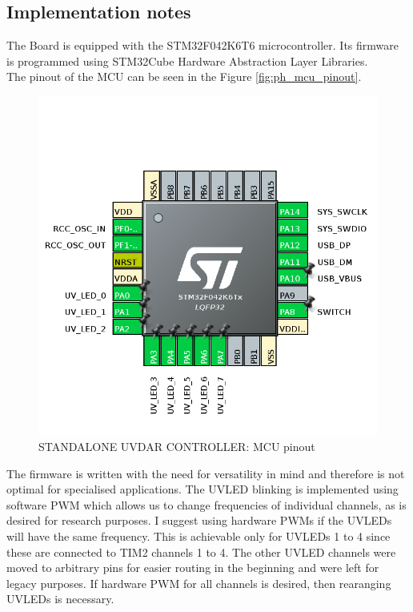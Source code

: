 \documentclass[12pt, a4paper]{article}
\begin{document}
\subsection{Implementation notes}
The Board is equipped with the STM32F042K6T6 microcontroller. Its firmware is programmed using STM32Cube Hardware Abstraction Layer Libraries.\\
The pinout of the MCU can be seen in the Figure \ref{fig:ph_mcu_pinout}.\\
\begin{figure}[h]
\centering
\includegraphics[width=0.9\linewidth]{figures/MCU_Pinout.png}
\caption{STANDALONE UVDAR CONTROLLER: MCU pinout}
\label{fig:mcu_pinout}
\end{figure}
The firmware is written with the need for versatility in mind and therefore is not optimal for specialised applications. The UVLED blinking is implemented using software PWM which allows us to change frequencies of individual channels, as is desired for research purposes. I suggest using hardware PWMs if the UVLEDs will have the same frequency. This is achievable only for UVLEDs 1 to 4 since these are connected to TIM2 channels 1 to 4. The other UVLED channels were moved to arbitrary pins for easier routing in the beginning and were left for legacy purposes. If hardware PWM for all channels is desired, then rearanging UVLEDs is necessary.

\pagebreak
\end{document}
